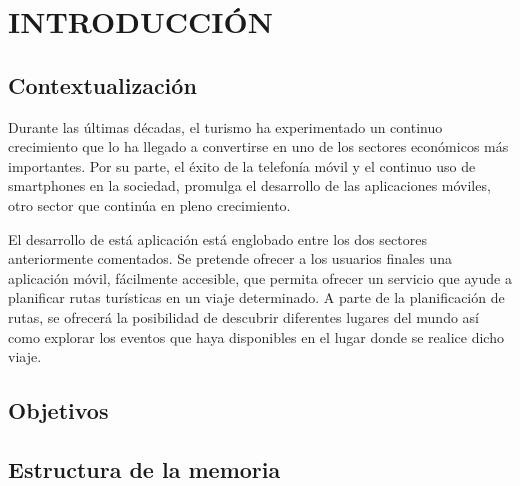 \setcounter{page}{1}
\chapter[Introducción]{
  \label{chp:introduccion}
  INTRODUCCIÓN
}
\thispagestyle{numberingStyle}
\pagestyle{numberingStyle}


\section{Contextualización}
Durante las últimas décadas, el turismo ha experimentado un continuo crecimiento que lo ha llegado a convertirse en uno de los sectores económicos más importantes. Por su parte, el éxito de la telefonía móvil y el continuo uso de smartphones en la sociedad, promulga el desarrollo de las aplicaciones móviles, otro sector que continúa en pleno crecimiento.

El desarrollo de está aplicación está englobado entre los dos sectores anteriormente comentados. Se pretende ofrecer a los usuarios finales una aplicación móvil, fácilmente accesible, que permita ofrecer un servicio que ayude a planificar rutas turísticas en un viaje determinado. A parte de la planificación de rutas, se ofrecerá la posibilidad de descubrir diferentes lugares del mundo así como explorar los eventos que haya disponibles en el lugar donde se realice dicho viaje.



\section{Objetivos}

\section{Estructura de la memoria}

